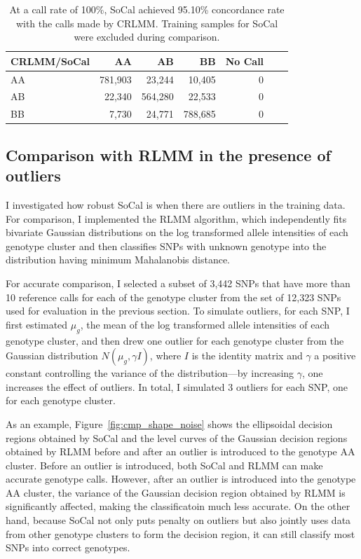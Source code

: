 \documentclass{scrartcl}
\begin{document}
\begin{table}[H]
\centering
\begin{tabular}{l*{5}{r}r}
    \hline
    CRLMM/SoCal   & AA       & AB      & BB      & No Call \\ \hline
    AA            & 781,903  & 23,244  & 10,405  & 0  \\
    AB            & 22,340   & 564,280 & 22,533  & 0  \\
    BB            & 7,730    & 24,771  & 788,685 & 0  \\ \hline
\end{tabular}
\caption{At a call rate of 100\%, SoCal achieved 95.10\% concordance rate
with the calls made by CRLMM. Training samples for SoCal were excluded during
comparison.}
\label{table:cmp_socal_crlmm}
\end{table}

\subsection{Comparison with RLMM in the presence of outliers}

\par
I investigated how robust SoCal is when there are outliers in the
training data.
For comparison, I implemented the RLMM algorithm, which independently
fits bivariate Gaussian distributions on the log transformed allele intensities
of each genotype cluster and then classifies SNPs with unknown genotype into
the distribution having minimum Mahalanobis distance. 

\par
For accurate comparison, I selected a subset of 3,442 SNPs that have
more than 10 reference calls for each of the genotype cluster from the set of
12,323 SNPs used for evaluation in the previous section.
To simulate outliers, for each SNP, I first estimated $\mu_g$, the mean of
the log transformed allele intensities of each genotype cluster, and then
drew one outlier for each genotype cluster from the Gaussian distribution
$N(\mu_g, \gamma I)$, where $I$ is the identity matrix and $\gamma$ a
positive constant controlling the variance of the distribution---by increasing
$\gamma$, one increases the effect of outliers.
In total, I simulated 3 outliers for each SNP, one for each genotype cluster.

\par
As an example, Figure~\ref{fig:cmp_shape_noise} shows the ellipsoidal decision
regions obtained by SoCal and the level curves of the Gaussian decision regions
obtained by RLMM before and after an outlier is introduced to the genotype AA
cluster.
Before an outlier is introduced, both SoCal and RLMM can make accurate
genotype calls.
However, after an outlier is introduced into the genotype AA cluster, the
variance of the Gaussian decision region obtained by RLMM is significantly
affected, making the classificatoin much less accurate.
On the other hand, because SoCal not only puts penalty on outliers but also
jointly uses data from other genotype clusters to form the decision region,
it can still classify most SNPs into correct genotypes.
\end{document}
